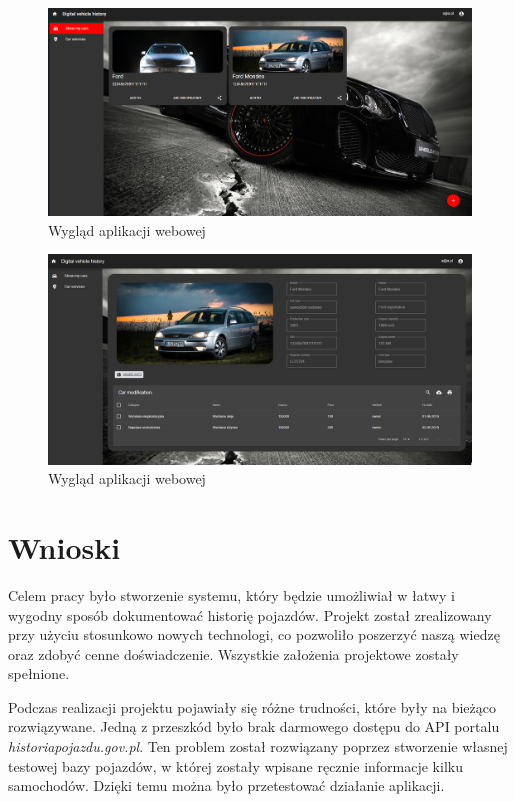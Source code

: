 \documentclass[12pt]{article}
\begin{document}
	\begin{figure}[H]
		\centering
		\includegraphics[scale=0.33]{app_web1.png}
		\caption{Wygląd aplikacji webowej}
		\label{app_webowa1}
	\end{figure}
		\begin{figure}[H]
		\centering
		\includegraphics[scale=0.33]{app_web2.png}
		\caption{Wygląd aplikacji webowej}
		\label{app_webowa2}
	\end{figure}


\newpage
\section{Wnioski}

Celem pracy było stworzenie systemu, który będzie umożliwiał w łatwy i wygodny sposób dokumentować historię pojazdów. Projekt został zrealizowany przy użyciu stosunkowo nowych technologi, co pozwoliło poszerzyć naszą wiedzę oraz zdobyć cenne doświadczenie. Wszystkie założenia projektowe zostały spełnione.

Podczas realizacji projektu pojawiały się różne trudności, które były na bieżąco rozwiązywane. Jedną z przeszkód było brak darmowego dostępu do API portalu \textit{historiapojazdu.gov.pl}. Ten problem został rozwiązany poprzez stworzenie własnej testowej bazy pojazdów, w której zostały wpisane ręcznie informacje kilku samochodów. Dzięki temu można było przetestować działanie aplikacji.
\end{document}

